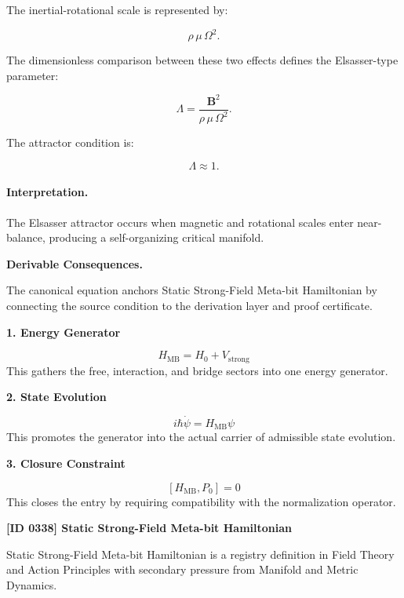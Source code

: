 The inertial-rotational scale is represented by:

\begin{equation}
\rho\,\mu\,\Omega^2 .
\end{equation}

The dimensionless comparison between these two effects defines the Elsasser-type parameter:

\begin{equation}
\boxed{
\Lambda
=
\frac{\mathbf{B}^2}
{\rho\,\mu\,\Omega^2}.
}
\end{equation}

The attractor condition is:

\begin{equation}
\Lambda \approx 1 .
\end{equation}

\paragraph{Interpretation.}
The Elsasser attractor occurs when magnetic and rotational scales enter near-balance, producing a self-organizing critical manifold.

\par\vspace{0.35em}
\noindent\textbf{Derivable Consequences.}\quad
\begingroup
\footnotesize
\raggedright
The canonical equation anchors Static Strong-Field Meta-bit Hamiltonian by connecting the source condition to the derivation layer and proof certificate.
\par\endgroup

\noindent\textbf{1. Energy Generator}\par
\[
H_{\mathrm{MB}}=H_{0}+V_{\mathrm{strong}}
\]
\noindent This gathers the free, interaction, and bridge sectors into one energy generator.\par
\noindent\textbf{2. State Evolution}\par
\[
i\hbar\dot{\psi}=H_{\mathrm{MB}}\psi
\]
\noindent This promotes the generator into the actual carrier of admissible state evolution.\par
\noindent\textbf{3. Closure Constraint}\par
\[
[H_{\mathrm{MB}},P_{0}]=0
\]
\noindent This closes the entry by requiring compatibility with the normalization operator.\par

\clearpage
\noindent\textbf{[ID 0338] Static Strong-Field Meta-bit Hamiltonian}\par
\vspace{0.35em}
\begingroup\small
{}
Static Strong-Field Meta-bit Hamiltonian is a registry definition in Field Theory and Action Principles with secondary pressure from Manifold and Metric Dynamics.

